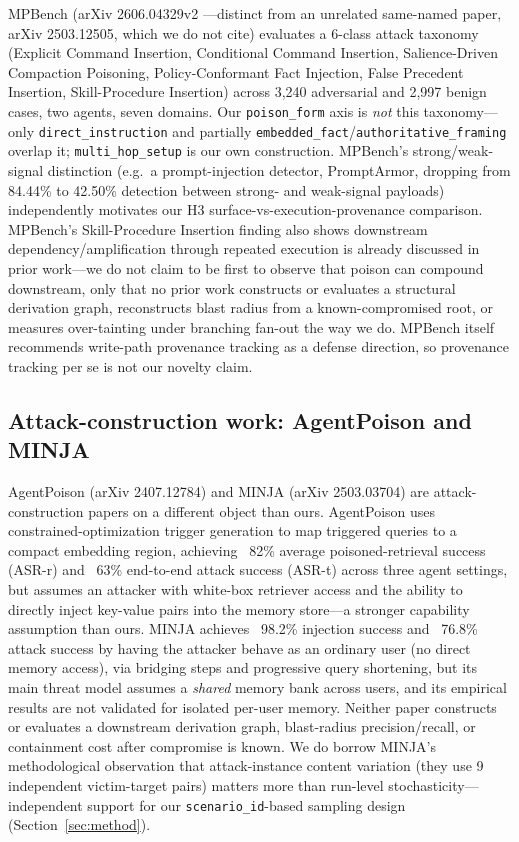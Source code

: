 MPBench (arXiv 2606.04329v2 \cite{mpbench}---distinct from an unrelated
same-named paper, arXiv 2503.12505, which we do not cite) evaluates a
6-class attack taxonomy (Explicit Command Insertion, Conditional
Command Insertion, Salience-Driven Compaction Poisoning,
Policy-Conformant Fact Injection, False Precedent Insertion,
Skill-Procedure Insertion) across 3,240 adversarial and 2,997 benign
cases, two agents, seven domains. Our \texttt{poison\_form} axis is
\emph{not} this taxonomy---only \texttt{direct\_instruction} and
partially \texttt{embedded\_fact}/\texttt{authoritative\_framing}
overlap it; \texttt{multi\_hop\_setup} is our own construction.
MPBench's strong/weak-signal distinction (e.g.\ a prompt-injection
detector, PromptArmor, dropping from 84.44\% to 42.50\% detection
between strong- and weak-signal payloads) independently motivates our
H3 surface-vs-execution-provenance comparison. MPBench's
Skill-Procedure Insertion finding also shows downstream
dependency/amplification through repeated execution is already
discussed in prior work---we do not claim to be first to observe that
poison can compound downstream, only that no prior work constructs or
evaluates a structural derivation graph, reconstructs blast radius from
a known-compromised root, or measures over-tainting under branching
fan-out the way we do. MPBench itself recommends write-path provenance
tracking as a defense direction, so provenance tracking per se is not
our novelty claim.

\subsection{Attack-construction work: AgentPoison and MINJA}

AgentPoison (arXiv 2407.12784) \cite{agentpoison} and MINJA (arXiv
2503.03704) \cite{minja} are attack-construction papers on a different
object than ours. AgentPoison uses constrained-optimization trigger
generation to map triggered queries to a compact embedding region,
achieving ~82\% average poisoned-retrieval success (ASR-r) and ~63\%
end-to-end attack success (ASR-t) across three agent settings, but
assumes an attacker with white-box retriever access and the ability to
directly inject key-value pairs into the memory store---a stronger
capability assumption than ours. MINJA achieves ~98.2\% injection
success and ~76.8\% attack success by having the attacker behave as an
ordinary user (no direct memory access), via bridging steps and
progressive query shortening, but its main threat model assumes a
\emph{shared} memory bank across users, and its empirical results are
not validated for isolated per-user memory. Neither paper constructs or
evaluates a downstream derivation graph, blast-radius precision/recall,
or containment cost after compromise is known. We do borrow MINJA's
methodological observation that attack-instance content variation (they
use 9 independent victim-target pairs) matters more than run-level
stochasticity---independent support for our \texttt{scenario\_id}-based
sampling design (Section~\ref{sec:method}).

